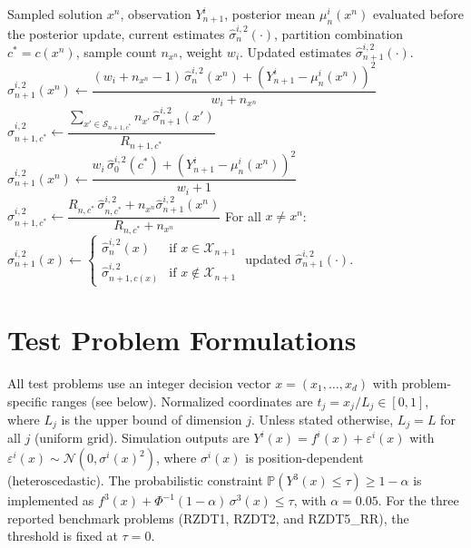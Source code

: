 \documentclass[12pt]{article}
\theoremstyle{plain}
\theoremstyle{definition}
\theoremstyle{remark}
\begin{document}
\begin{algorithm}[ht]
\caption{VEPM Update at Stage $n$}\label{alg:vepm_update}
\begin{algorithmic}[1]
\Require Sampled solution $x^n$, observation $Y^i_{n+1}$, posterior mean
  $\mu^i_n(x^n)$ evaluated before the posterior update, current estimates $\hat{\sigma}^{i,2}_n(\cdot)$,
  partition combination $c^* = c(x^n)$, sample count $n_{x^n}$, weight $w_i$.
\Ensure Updated estimates $\hat{\sigma}^{i,2}_{n+1}(\cdot)$.
 
  \State $\hat{\sigma}^{i,2}_{n+1}(x^n) \leftarrow
    \dfrac{(w_i + n_{x^n}-1)\,\hat{\sigma}^{i,2}_n(x^n)
           + (Y^i_{n+1} - \mu^i_n(x^n))^2}{w_i + n_{x^n}}$
  \State $\hat{\sigma}^{i,2}_{n+1,c^*} \leftarrow
    \dfrac{\sum_{x' \in \mathcal{S}_{n+1,c^*}}
      n_{x'}\,\hat{\sigma}^{i,2}_{n+1}(x')}{R_{n+1,c^*}}$
\Else {}
  \State $\hat{\sigma}^{i,2}_{n+1}(x^n) \leftarrow
    \dfrac{w_i\,\hat{\sigma}^{i,2}_0(c^*) + (Y^i_{n+1} - \mu^i_n(x^n))^2}{w_i + 1}$
  \State $\hat{\sigma}^{i,2}_{n+1,c^*} \leftarrow
    \dfrac{R_{n,c^*}\,\hat{\sigma}^{i,2}_{n,c^*}
           + n_{x^n}\hat{\sigma}^{i,2}_{n+1}(x^n)}{R_{n,c^*}+n_{x^n}}$
\EndIf
\State For all $x \neq x^n$: $\hat{\sigma}^{i,2}_{n+1}(x) \leftarrow
  \begin{cases}
    \hat{\sigma}^{i,2}_n(x) & \text{if } x \in \mathcal{X}_{n+1} \\
    \hat{\sigma}^{i,2}_{n+1,c(x)} & \text{if } x \notin \mathcal{X}_{n+1}
  \end{cases}$
\State \Return updated $\hat{\sigma}^{i,2}_{n+1}(\cdot)$.
\end{algorithmic}
\end{algorithm}

\section{Test Problem Formulations}\label{app:test_problems}

All test problems use an integer decision vector
$x = (x_1, \ldots, x_d)$ with problem-specific ranges (see below).
Normalized coordinates are $t_j = x_j / L_j \in [0,1]$, where $L_j$ is
the upper bound of dimension $j$.  Unless stated otherwise, $L_j = L$
for all $j$ (uniform grid).  Simulation outputs are
$Y^i(x) = f^i(x) + \varepsilon^i(x)$ with
$\varepsilon^i(x) \sim \mathcal{N}(0, \sigma^i(x)^2)$, where
$\sigma^i(x)$ is position-dependent (heteroscedastic).
The probabilistic constraint $\mathbb{P}(Y^3(x) \leq \tau) \geq 1-\alpha$
is implemented as $f^3(x) + \Phi^{-1}(1-\alpha)\,\sigma^3(x) \leq \tau$,
with $\alpha=0.05$.  For the three reported benchmark problems
(RZDT1, RZDT2, and RZDT5\_RR), the threshold is fixed at $\tau=0$.
\end{document}
